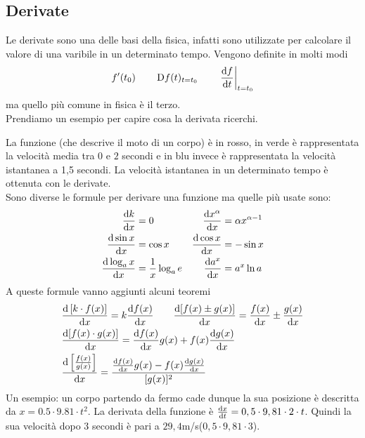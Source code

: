 \subsection{Derivate}
Le derivate sono una delle basi della fisica, infatti sono utilizzate per calcolare il valore di 
una varibile in un determinato tempo. Vengono definite in molti modi 
\begin{equation*}
  f'(t_0) \qquad \mathop{}\!\mathrm{D} f(t)_{t=t_0}\qquad \left.\frac{\mathop{}\!\mathrm{d} f}{\mathop{}\!\mathrm{d} t}\right|_{t=t_0}
  \end{equation*}
  ma quello più comune in fisica è il terzo.\\
  Prendiamo un esempio per capire cosa la derivata ricerchi.
  \begin{center}
  \end{center}
  La funzione (che descrive il moto di un corpo) è in rosso, in verde è rappresentata la velocità 
  media tra $0$ e $2$ secondi e in blu invece è rappresentata la velocità istantanea a 1,5 secondi. 
  La velocità istantanea in un determinato tempo è ottenuta con le derivate.\\
  Sono diverse le formule per derivare una funzione ma quelle più usate sono:
  \begin{align*}
    \frac{\dif k}{\dif x}&=0 &\quad \frac{\dif x^\alpha}{\dif x}&=\alpha x^{\alpha-1}\\
    \frac{\dif\sin x}{\dif x}&=\cos x & \frac{\dif\cos x}{\dif x}&=-\sin x\\
    \frac{\dif\log_ax}{\dif x}&=\frac{1}{x}\log_ae & \frac{\dif a^{x}}{\dif x}&=a^{x}\ln a
  \end{align*}
  A queste formule vanno aggiunti alcuni teoremi
  \begin{align*}
    &\frac{\dif\left[k\cdot f(x) \right]}{\dif x}=k\frac{\dif f(x)}{\dif x}\qquad
    \frac{\dif[f(x)\pm g(x)]}{\dif x}=\frac{f(x)}{\dif x}\pm \frac{g(x)}{\dif x}\\
    &\frac{\dif [f(x)\cdot g(x)]}{\dif x}=\frac{\dif f(x)}{\dif x}g(x) + 
    f(x)\frac{\dif g(x)}{\dif x}\\
    &\frac{\dif \left[\frac{f(x)}{g(x)}\right]}{\dif x} =
    \frac{\frac{\dif f(x)}{\dif x}g(x)-f(x)\frac{\dif g(x)}{\dif x}}{[g(x)]^2}
  \end{align*}
  Un esempio: un corpo partendo da fermo cade dunque la sua posizione è descritta da 
  $x=0.5\cdot9.81\cdot t^{2}$. La derivata della funzione è 
  $\frac{\mathop{}\!\mathrm{d} x}{\mathop{}\!\mathrm{d} t}=0,5\cdot9,81\cdot2\cdot t$. 
  Quindi la sua velocità dopo 3 secondi è pari a $29,4$m/s($0,5\cdot9,81\cdot3$).
